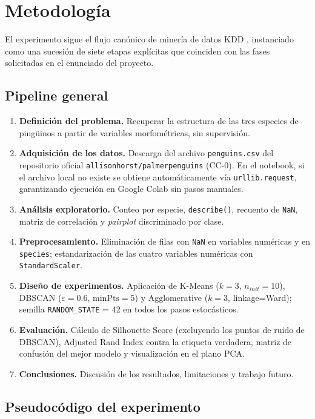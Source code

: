 \section{Metodología}

El experimento sigue el flujo canónico de minería de datos KDD \citep{fayyad1996kdd}, instanciado como una sucesión de siete etapas explícitas que coinciden con las fases solicitadas en el enunciado del proyecto.

\subsection{Pipeline general}

\begin{enumerate}
  \item \textbf{Definición del problema.} Recuperar la estructura de las tres especies de pingüinos a partir de variables morfométricas, sin supervisión.
  \item \textbf{Adquisición de los datos.} Descarga del archivo \texttt{penguins.csv} del repositorio oficial \texttt{allisonhorst/palmerpenguins} (CC-0). En el notebook, si el archivo local no existe se obtiene automáticamente vía \texttt{urllib.request}, garantizando ejecución en Google Colab sin pasos manuales.
  \item \textbf{Análisis exploratorio.} Conteo por especie, \texttt{describe()}, recuento de \texttt{NaN}, matriz de correlación y \emph{pairplot} discriminado por clase.
  \item \textbf{Preprocesamiento.} Eliminación de filas con \texttt{NaN} en variables numéricas y en \texttt{species}; estandarización de las cuatro variables numéricas con \texttt{StandardScaler}.
  \item \textbf{Diseño de experimentos.} Aplicación de K-Means ($k=3$, $n_{init}=10$), DBSCAN ($\varepsilon=0.6$, $\text{minPts}=5$) y Agglomerative ($k=3$, linkage=Ward); semilla \texttt{RANDOM\_STATE} = 42 en todos los pasos estocásticos.
  \item \textbf{Evaluación.} Cálculo de Silhouette Score (excluyendo los puntos de ruido de DBSCAN), Adjusted Rand Index contra la etiqueta verdadera, matriz de confusión del mejor modelo y visualización en el plano PCA.
  \item \textbf{Conclusiones.} Discusión de los resultados, limitaciones y trabajo futuro.
\end{enumerate}

\subsection{Pseudocódigo del experimento}

